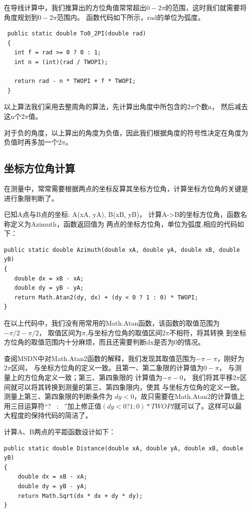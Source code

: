 在导线计算中，我们推算出的方位角值常常超出$0 -2\pi$的范围，这时我们就需要将角度规划到$0 -2\pi$范围内。
函数代码如下所示，rad的单位为弧度。

\begin{lstlisting}
 public static double To0_2PI(double rad)
 {
   int f = rad >= 0 ? 0 : 1;
   int n = (int)(rad / TWOPI);

   return rad - n * TWOPI + f * TWOPI;
 }
 \end{lstlisting}

 以上算法我们采用去整周角的算法，先计算出角度中所包含的$2\pi$个数n，
 然后减去这n个$2\pi$值。

 对于负的角度，以上算出的角度为负值，因此我们根据角度的符号性决定在角度为负值时再多加一个$2\pi$。


\subsection{坐标方位角计算}

在测量中，常常需要根据两点的坐标反算其坐标方位角，计算坐标方位角的关键是进行象限判断了。

已知A点与B点的坐标: A(xA, yA), B(xB, yB)， 计算A->B的坐标方位角，函数名称定义为Azimuth，函数返回值为
两点的坐标方位角，单位为弧度,相应的代码如下：

\begin{lstlisting}
public static double Azimuth(double xA, double yA, double xB, double yB)
{
   double dx = xB - xA;
   double dy = yB - yA;
   return Math.Atan2(dy, dx) + (dy < 0 ? 1 : 0) * TWOPI;
}
\end{lstlisting}

在以上代码中，我们没有用常用的Math.Atan函数，该函数的取值范围为$-\pi /2 - \pi/2$，
取值区间为$\pi$,与坐标方位角的取值区间$2\pi$不相符，将其转换
到坐标方位角的取值范围内十分麻烦，而且还需要判断dx是否为0的情况。

查阅MSDN中对Math.Atan2函数的解释，我们发现其取值范围为$-\pi - \pi$，刚好为$2\pi$区间，
与坐标方位角的定义一致。且第一、第二象限的计算值为$0-\pi$， 与测量上的方位角定义一致；第三、第四象限的
计算值为$-\pi - 0$， 我们将其平移$2\pi$区间就可以将其转换到测量的第三、第四象限内，使其
与坐标方位角的定义一致。测量上第三、第四象限的判断条件为 $dy<0$，故只需要在Math.Atan2的计算值上
用三目运算符``?~ : ~''加上修正值$(dy < 0 ? 1 : 0) * TWOPI$就可以了。这样可以最大程度的保持代码的简洁了。

计算A、B两点的平距函数设计如下：
\begin{lstlisting}
public static double Distance(double xA, double yA, double xB, double yB)
{
    double dx = xB - xA;
    double dy = yB - yA;
    return Math.Sqrt(dx * dx + dy * dy);
}
\end{lstlisting}

